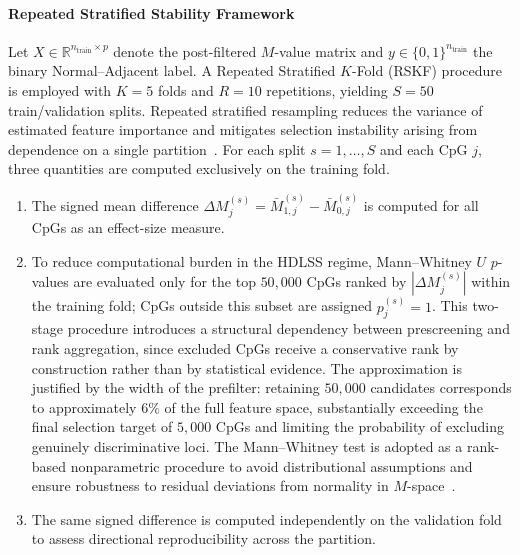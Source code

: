 \paragraph{Repeated Stratified Stability Framework}

Let $X \in \mathbb{R}^{n_{\mathrm{train}} \times p}$ denote 
the post-filtered $M$-value matrix and 
$y \in \{0,1\}^{n_{\mathrm{train}}}$ the binary 
Normal--Adjacent label. A Repeated Stratified $K$-Fold (RSKF) procedure is employed with $K=5$ folds and $R=10$ repetitions, yielding $S = 50$ train/validation splits. 
Repeated stratified resampling reduces the variance of 
estimated feature importance and mitigates selection 
instability arising from dependence on a single 
partition~\cite{Ambroise2002, Smialowski2010}.
For each split $s = 1,\dots,S$ and each CpG $j$, three quantities are computed exclusively on the training fold.
\begin{enumerate}
\item The signed mean difference
\(
\Delta M_{j}^{(s)} = \bar{M}_{1,j}^{(s)} - \bar{M}_{0,j}^{(s)}
\)
is computed for all CpGs as an effect-size measure.

\item To reduce computational burden in the HDLSS regime,
Mann--Whitney $U$ $p$-values are evaluated only for the top
$50{,}000$ CpGs ranked by $|\Delta M_{j}^{(s)}|$ within the
training fold; CpGs outside this subset are assigned
$p_{j}^{(s)} = 1$.
This two-stage procedure introduces a structural dependency
between prescreening and rank aggregation, since excluded CpGs
receive a conservative rank by construction rather than by
statistical evidence. The approximation is justified by the
width of the prefilter: retaining $50{,}000$ candidates
corresponds to approximately $6\%$ of the full feature space,
substantially exceeding the final selection target of $5{,}000$
CpGs and limiting the probability of excluding genuinely
discriminative loci.
The Mann--Whitney test is adopted as a rank-based nonparametric
procedure to avoid distributional assumptions and ensure
robustness to residual deviations from normality in
$M$-space~\cite{MannWhitney1947}.
\item The same signed difference is computed independently on the validation fold to assess directional reproducibility across the partition.
\end{enumerate}

